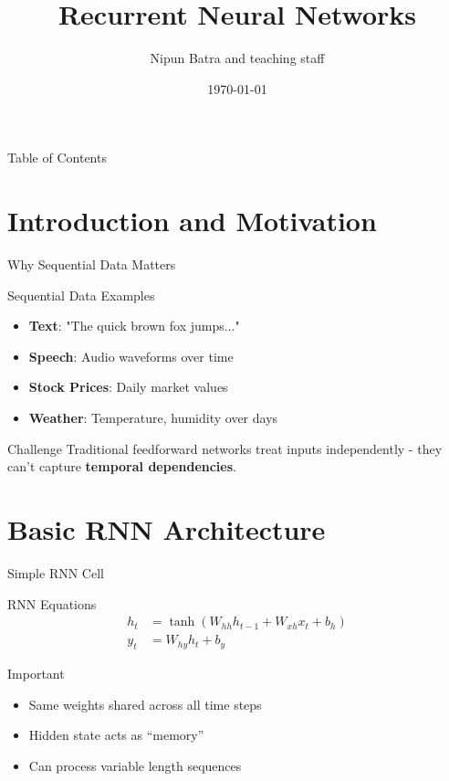\documentclass[usenames,dvipsnames]{beamer}
\title{Recurrent Neural Networks}
\date{\today}
\author{Nipun Batra and teaching staff}
\institute{IIT Gandhinagar}
\begin{document}
	\maketitle
	
	\begin{frame}{Table of Contents}
		\tableofcontents[hideallsubsections]
	\end{frame}
	
	\section{Introduction and Motivation}
	
	\begin{frame}{Why Sequential Data Matters}
		\begin{examplebox}{Sequential Data Examples}
			\begin{itemize}
				\item \textbf{Text}: "The quick brown fox jumps..."
				\item \textbf{Speech}: Audio waveforms over time
				\item \textbf{Stock Prices}: Daily market values
				\item \textbf{Weather}: Temperature, humidity over days
			\end{itemize}
		\end{examplebox}
		
		\begin{alertbox}{Challenge}
			Traditional feedforward networks treat inputs independently - they can't capture \textbf{temporal dependencies}.
		\end{alertbox}
	\end{frame}
	
	\section{Basic RNN Architecture}
	
	\begin{frame}{Simple RNN Cell}
		\begin{definitionbox}{RNN Equations}
			\begin{align}
				h_t &= \tanh(W_{hh} h_{t-1} + W_{xh} x_t + b_h) \\
				y_t &= W_{hy} h_t + b_y
			\end{align}
		\end{definitionbox}
		
		\begin{keypointsbox}{Important}
			\begin{itemize}
				\item Same weights shared across all time steps
				\item Hidden state acts as ``memory''
				\item Can process variable length sequences
			\end{itemize}
		\end{keypointsbox}
	\end{frame}
	
\end{document}
